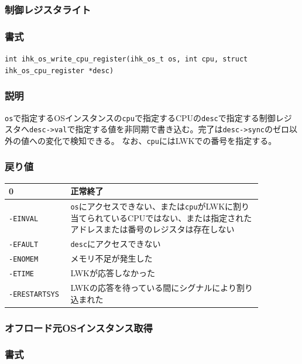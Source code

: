 \documentclass[twoside,11pt,fleqn]{book}
\begin{document}
\subsubsection{制御レジスタライト}
\subsubsection*{書式}{\quad} \texttt{int ihk\_os\_write\_cpu\_register(ihk\_os\_t os, int cpu, struct ihk\_os\_cpu\_register *desc)}
\subsubsection*{説明}{\quad}
\texttt{os}で指定するOSインスタンスの\texttt{cpu}で指定するCPUの\texttt{desc}で指定する制御レジスタへ\texttt{desc->val}で指定する値を非同期で書き込む。完了は\texttt{desc->sync}のゼロ以外の値への変化で検知できる。 なお、\texttt{cpu}にはLWKでの番号を指定する。

\subsubsection*{戻り値}
\begin{table}[!h]
\footnotesize
\begin{tabular}{|p{0.20\linewidth}|p{0.66\linewidth}|} \hline
0&正常終了\\ \hline
\texttt{-EINVAL}&\texttt{os}にアクセスできない、または\texttt{cpu}がLWKに割り当てられているCPUではない、または指定されたアドレスまたは番号のレジスタは存在しない\\ \hline
\texttt{-EFAULT}&\texttt{desc}にアクセスできない\\ \hline
\verb:-ENOMEM:&メモリ不足が発生した\\ \hline
\verb:-ETIME:&LWKが応答しなかった\\ \hline
\verb:-ERESTARTSYS:&LWKの応答を待っている間にシグナルにより割り込まれた\\ \hline
\end{tabular}
\vspace{-0em}
\end{table}
\FloatBarrier

\subsubsection{オフロード元OSインスタンス取得}
\subsubsection*{書式}{\quad} 
\end{document}
